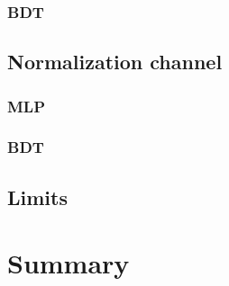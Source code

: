 \documentclass[10pt,a4paper]{article}
\begin{document}
\subsubsection{BDT}
\subsection{Normalization channel}
\subsubsection{MLP}
\subsubsection{BDT}
\subsection{Limits}


\section{Summary}




\end{document}
